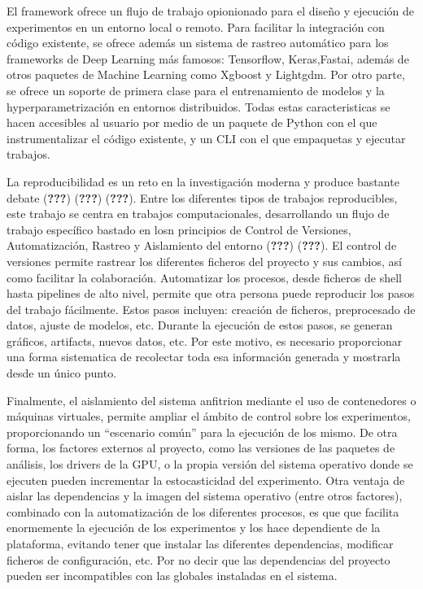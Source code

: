 \documentclass[
  12pt,
  a4paperpaper,
]{report}
\begin{document}
El framework ofrece un flujo de trabajo opionionado para el diseño y
ejecución de experimentos en un entorno local o remoto. Para facilitar
la integración con código existente, se ofrece además un sistema de
rastreo automático para los frameworks de Deep Learning más famosos:
Tensorflow, Keras,Fastai, además de otros paquetes de Machine Learning
como Xgboost y Lightgdm. Por otro parte, se ofrece un soporte de primera
clase para el entrenamiento de modelos y la hyperparametrización en
entornos distribuidos. Todas estas caracteristicas se hacen accesibles
al usuario por medio de un paquete de Python con el que instrumentalizar
el código existente, y un CLI con el que empaquetas y ejecutar trabajos.

La reproducibilidad es un reto en la investigación moderna y produce
bastante debate ({\textbf{???}}) ({\textbf{???}}) ({\textbf{???}}).
Entre los diferentes tipos de trabajos reproducibles, este trabajo se
centra en trabajos computacionales, desarrollando un flujo de trabajo
específico bastado en losn principios de Control de Versiones,
Automatización, Rastreo y Aislamiento del entorno ({\textbf{???}})
({\textbf{???}}). El control de versiones permite rastrear los
diferentes ficheros del proyecto y sus cambios, así como facilitar la
colaboración. Automatizar los procesos, desde ficheros de shell hasta
pipelines de alto nivel, permite que otra persona puede reproducir los
pasos del trabajo fácilmente. Estos pasos incluyen: creación de
ficheros, preprocesado de datos, ajuste de modelos, etc. Durante la
ejecución de estos pasos, se generan gráficos, artifacts, nuevos datos,
etc. Por este motivo, es necesario proporcionar una forma sistematica de
recolectar toda esa información generada y mostrarla desde un único
punto.

Finalmente, el aislamiento del sistema anfitrion mediante el uso de
contenedores o máquinas virtuales, permite ampliar el ámbito de control
sobre los experimentos, proporcionando un ``escenario común'' para la
ejecución de los mismo. De otra forma, los factores externos al
proyecto, como las versiones de las paquetes de análisis, los drivers de
la GPU, o la propia versión del sistema operativo donde se ejecuten
pueden incrementar la estocasticidad del experimento. Otra ventaja de
aislar las dependencias y la imagen del sistema operativo (entre otros
factores), combinado con la automatización de los diferentes procesos,
es que que facilita enormemente la ejecución de los experimentos y los
hace dependiente de la plataforma, evitando tener que instalar las
diferentes dependencias, modificar ficheros de configuración, etc. Por
no decir que las dependencias del proyecto pueden ser incompatibles con
las globales instaladas en el sistema.
\end{document}

